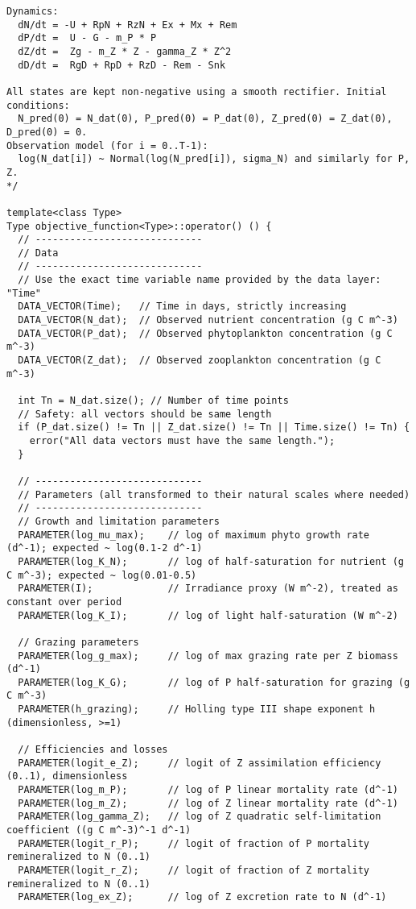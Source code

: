 \begin{lstlisting}
Dynamics:
  dN/dt = -U + RpN + RzN + Ex + Mx + Rem
  dP/dt =  U - G - m_P * P
  dZ/dt =  Zg - m_Z * Z - gamma_Z * Z^2
  dD/dt =  RgD + RpD + RzD - Rem - Snk

All states are kept non-negative using a smooth rectifier. Initial conditions:
  N_pred(0) = N_dat(0), P_pred(0) = P_dat(0), Z_pred(0) = Z_dat(0), D_pred(0) = 0.
Observation model (for i = 0..T-1):
  log(N_dat[i]) ~ Normal(log(N_pred[i]), sigma_N) and similarly for P, Z.
*/

template<class Type>
Type objective_function<Type>::operator() () {
  // -----------------------------
  // Data
  // -----------------------------
  // Use the exact time variable name provided by the data layer: "Time"
  DATA_VECTOR(Time);   // Time in days, strictly increasing
  DATA_VECTOR(N_dat);  // Observed nutrient concentration (g C m^-3)
  DATA_VECTOR(P_dat);  // Observed phytoplankton concentration (g C m^-3)
  DATA_VECTOR(Z_dat);  // Observed zooplankton concentration (g C m^-3)

  int Tn = N_dat.size(); // Number of time points
  // Safety: all vectors should be same length
  if (P_dat.size() != Tn || Z_dat.size() != Tn || Time.size() != Tn) {
    error("All data vectors must have the same length.");
  }

  // -----------------------------
  // Parameters (all transformed to their natural scales where needed)
  // -----------------------------
  // Growth and limitation parameters
  PARAMETER(log_mu_max);    // log of maximum phyto growth rate (d^-1); expected ~ log(0.1-2 d^-1)
  PARAMETER(log_K_N);       // log of half-saturation for nutrient (g C m^-3); expected ~ log(0.01-0.5)
  PARAMETER(I);             // Irradiance proxy (W m^-2), treated as constant over period
  PARAMETER(log_K_I);       // log of light half-saturation (W m^-2)

  // Grazing parameters
  PARAMETER(log_g_max);     // log of max grazing rate per Z biomass (d^-1)
  PARAMETER(log_K_G);       // log of P half-saturation for grazing (g C m^-3)
  PARAMETER(h_grazing);     // Holling type III shape exponent h (dimensionless, >=1)

  // Efficiencies and losses
  PARAMETER(logit_e_Z);     // logit of Z assimilation efficiency (0..1), dimensionless
  PARAMETER(log_m_P);       // log of P linear mortality rate (d^-1)
  PARAMETER(log_m_Z);       // log of Z linear mortality rate (d^-1)
  PARAMETER(log_gamma_Z);   // log of Z quadratic self-limitation coefficient ((g C m^-3)^-1 d^-1)
  PARAMETER(logit_r_P);     // logit of fraction of P mortality remineralized to N (0..1)
  PARAMETER(logit_r_Z);     // logit of fraction of Z mortality remineralized to N (0..1)
  PARAMETER(log_ex_Z);      // log of Z excretion rate to N (d^-1)


\end{lstlisting}
